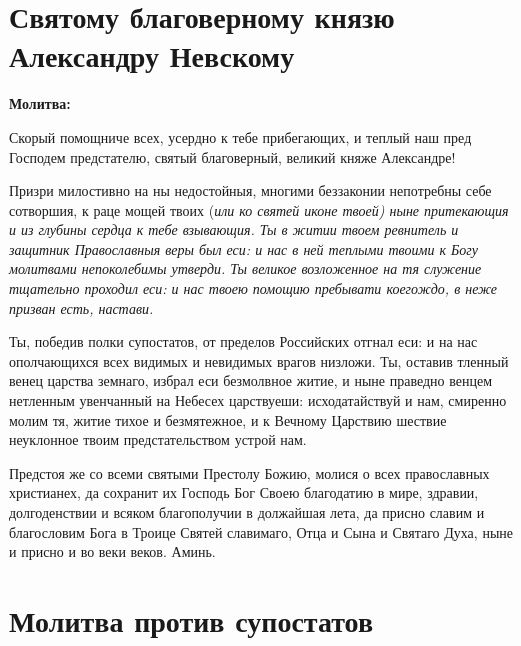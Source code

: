 

\label{_content_za-voinov}

 


 

\section{Святому благоверному князю Александру Невскому}
 


\bfseries Молитва:\normalfont{}\nopagebreak


Скорый помощниче всех, усердно к тебе прибегающих, и теплый наш пред Господем предстателю, святый благоверный, великий княже Александре! 

Призри милостивно на ны недостойныя, многими беззаконии непотребны себе сотворшия, к раце мощей твоих (\itshape или\normalfont{} ко святей иконе твоей) ныне притекающия и из глубины сердца к тебе взывающия. Ты в житии твоем ревнитель и защитник Православныя веры был еси: и нас в ней теплыми твоими к Богу молитвами непоколебимы утверди. Ты великое возложенное на тя служение тщательно проходил еси: и нас твоею помощию пребывати коегождо, в неже призван есть, настави. 

Ты, победив полки супостатов, от пределов Российских отгнал еси: и на нас ополчающихся всех видимых и невидимых врагов низложи. Ты, оставив тленный венец царства земнаго, избрал еси безмолвное житие, и ныне праведно венцем нетленным увенчанный на Небесех царствуеши: исходатайствуй и нам, смиренно молим тя, житие тихое и безмятежное, и к Вечному Царствию шествие неуклонное твоим предстательством устрой нам. 

Предстоя же со всеми святыми Престолу Божию, молися о всех православных христианех, да сохранит их Господь Бог Своею благодатию в мире, здравии, долгоденствии и всяком благополучии в должайшая лета, да присно славим и благословим Бога в Троице Святей славимаго, Отца и Сына и Святаго Духа, ныне и присно и во веки веков. Аминь.

\section{Молитва против супостатов}
 


